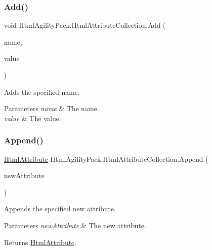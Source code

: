 \subsubsection{\texorpdfstring{Add()}{Add()}\hspace{0.1cm}{\footnotesize\ttfamily [2/2]}}
{\footnotesize\ttfamily void Html\+Agility\+Pack.\+Html\+Attribute\+Collection.\+Add (\begin{DoxyParamCaption}\item[{string}]{name,  }\item[{string}]{value }\end{DoxyParamCaption})\hspace{0.3cm}{\ttfamily [inline]}}



Adds the specified name. 


\begin{DoxyParams}{Parameters}
{\em name} & The name.\\
\hline
{\em value} & The value.\\
\hline
\end{DoxyParams}
\mbox{\label{class_html_agility_pack_1_1_html_attribute_collection_abb8459035cd943eefff38de0acdd534e}} 
\subsubsection{\texorpdfstring{Append()}{Append()}\hspace{0.1cm}{\footnotesize\ttfamily [1/3]}}
{\footnotesize\ttfamily \hyperlink{class_html_agility_pack_1_1_html_attribute}{Html\+Attribute} Html\+Agility\+Pack.\+Html\+Attribute\+Collection.\+Append (\begin{DoxyParamCaption}\item[{\hyperlink{class_html_agility_pack_1_1_html_attribute}{Html\+Attribute}}]{new\+Attribute }\end{DoxyParamCaption})\hspace{0.3cm}{\ttfamily [inline]}}



Appends the specified new attribute. 


\begin{DoxyParams}{Parameters}
{\em new\+Attribute} & The new attribute.\\
\hline
\end{DoxyParams}
\begin{DoxyReturn}{Returns}
\hyperlink{class_html_agility_pack_1_1_html_attribute}{Html\+Attribute}.
\end{DoxyReturn}

